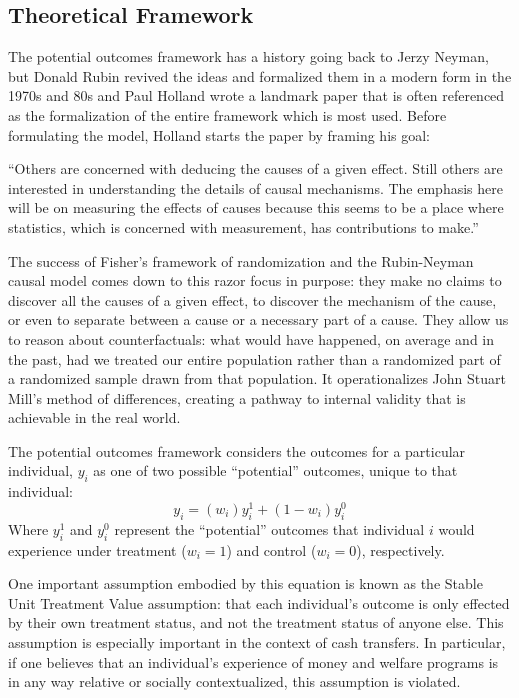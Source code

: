 \documentclass[a4paper,12pt]{article}
\begin{document}
\subsection{ Theoretical Framework }

The potential outcomes framework has a history going back to Jerzy Neyman, but Donald Rubin revived the ideas and formalized them in a modern form in the 1970s and 80s and Paul Holland \parencite*{Holland1986} wrote a landmark paper that is often referenced as the formalization of the entire framework which is most used. Before formulating the model, Holland starts the paper by framing his goal:

\begin{displayquote}
``Others are concerned with deducing the causes of a given effect. Still others are interested in understanding the details of causal mechanisms. The emphasis here will be on measuring the effects of causes because this seems to be a place where statistics, which is concerned with measurement, has contributions to make.''
\end{displayquote}

The success of Fisher's framework of randomization and the Rubin-Neyman causal model comes down to this razor focus in purpose: they make no claims to discover all the causes of a given effect, to discover the mechanism of the cause, or even to separate between a cause or a necessary part of a cause. They allow us to reason about counterfactuals: what would have happened, on average and in the past, had we treated our entire population rather than a randomized part of a randomized sample drawn from that population. It operationalizes John Stuart Mill's method of differences, creating a pathway to internal validity that is achievable in the real world.

The potential outcomes framework considers the outcomes for a particular individual, $y_i$ as one of two possible ``potential'' outcomes, unique to that individual:
$$
y_i = (w_i)y^1_i + (1 - w_i)y^0_i
$$
Where $y^1_i$ and $y^0_i$ represent the ``potential'' outcomes that individual $i$ would experience under treatment ($w_i = 1$) and control ($w_i = 0$), respectively.

One important assumption embodied by this equation is known as the Stable Unit Treatment Value assumption: that each individual's outcome is only effected by their own treatment status, and not the treatment status of anyone else. This assumption is especially important in the context of cash transfers. In particular, if one believes that an individual's experience of money and welfare programs is in any way relative or socially contextualized, this assumption is violated.
\end{document}
